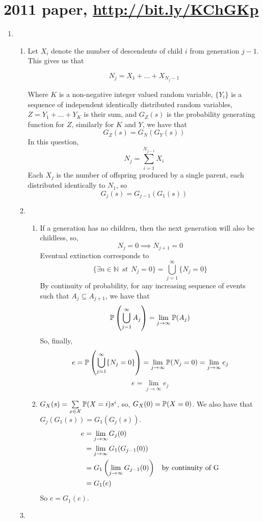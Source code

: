 \documentclass{article}
\begin{document}
\section*{2011 paper, \url{http://bit.ly/KChGKp}}
\begin{enumerate}
\item
\begin{enumerate}
\item
Let $X_i$ denote the number of descendents of child $i$ from generation $j-1$.
This gives us that

$$
N_j = X_1 + \dots + X_{N_j-1}
$$

Where $K$ is a non-negative integer valued random variable, $\{Y_i\}$ is a
sequence of independent identically distributed random variables,
$Z=Y_1+\dots+Y_K$ is their sum, and $G_Z(s)$ is the probability generating
function for $Z$, similarly for $K$ and $Y$, we have that
$$
G_Z(s) = G_N(G_Y(s))
$$
In this question, 
$$
N_j=\sum^{N_{j-1}}_{i=1}X_i
$$
Each $X_j$ is the number of offspring produced by a single parent, each
distributed identically to $N_1$, so
$$
G_j(s) = G_{j-1}(G_1(s))
$$
\item
\begin{enumerate}
\item 
If a generation has no children, then the next generation will also be
childless, so,
$$
N_j=0 \implies N_{j+1}=0
$$
Eventual extinction corresponds to 
$$
\{\exists n \in \mathbb{N} \;\, st \;\, N_j=0\} = \bigcup^\infty_{j=1}\{N_j=0\}
$$
By continuity of probability, for any increasing sequence of events such that
$A_j \subseteq A_{j+1}$, we have that
$$
\mathbb{P}\left(\bigcup^\infty_{j=1}A_j\right) = \lim_{j\rightarrow\infty} \mathbb{P}(A_j)
$$
So, finally,
$$
e=\mathbb{P}\left(\bigcup^\infty_{j=1}\{N_j=0\}\right) = \lim_{j\rightarrow\infty}
\mathbb{P}(N_j=0) = \lim_{j\rightarrow\infty}e_j
$$
$$
e=\lim_{j\rightarrow\infty}e_j
$$
\item
$G_X(s) = \sum\limits_{x \in \mathcal{X}}\mathbb{P}(X=i)s^i$, so, $G_X(0) = \mathbb{P}(X=0)$.
We also have that $G_j(G_1(s)) = G_1(G_j(s))$.
\begin{align*}
e &= \lim_{j\rightarrow\infty}G_j(0)\\
&= \lim_{j\rightarrow\infty}G_1(G_{j-1}(0))\\
&= G_1\left(\lim_{j\rightarrow\infty}G_{j-1}(0)\right)\mbox{\;\; by continuity of G}\\
&= G_1(e)
\end{align*}
So $e = G_1(e)$.
\end{enumerate}
\item
\begin{enumerate}

\end{enumerate}
\end{enumerate}
\end{enumerate}
\end{document}
